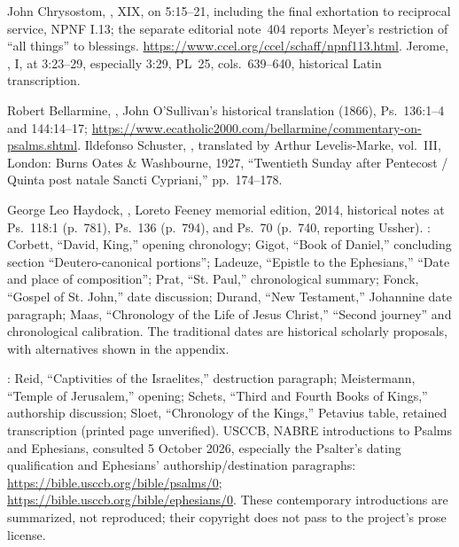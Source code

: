 \begin{description}[style=nextline,leftmargin=0pt,labelsep=0pt,itemsep=.45em]
\item[Chrysostom and Jerome]
John Chrysostom, , XIX, on 5:15--21,
including the final exhortation to reciprocal service, NPNF I.13;
the separate editorial note~404 reports Meyer's restriction of ``all
things'' to blessings. \url{https://www.ccel.org/ccel/schaff/npnf113.html}.
Jerome, , I, at 3:23--29, especially 3:29,
PL~25, cols.~639--640, historical Latin transcription.

\item[Later saintly and liturgical reception]
Robert Bellarmine, , John
O'Sullivan's historical translation (1866), Ps.~136:1--4 and
144:14--17; \url{https://www.ecatholic2000.com/bellarmine/commentary-on-psalms.shtml}.
Ildefonso Schuster, , translated by Arthur
Levelis-Marke, vol.~III, London: Burns Oates \& Washbourne, 1927,
``Twentieth Sunday after Pentecost / Quinta post natale Sancti Cypriani,''
pp.~174--178.

\item[Scriptural chronology and historical attribution]
George Leo Haydock, ,
Loreto Feeney memorial edition, 2014, historical notes at Ps.~118:1
(p.~781), Ps.~136 (p.~794), and Ps.~70 (p.~740, reporting Ussher).
: Corbett, ``David, King,'' opening
chronology; Gigot, ``Book of Daniel,'' concluding section
``Deutero-canonical portions''; Ladeuze, ``Epistle to the Ephesians,''
``Date and place of composition''; Prat, ``St. Paul,'' chronological
summary; Fonck, ``Gospel of St. John,'' date discussion;
Durand, ``New Testament,'' Johannine date paragraph;
Maas, ``Chronology of the Life of Jesus Christ,'' ``Second journey''
and chronological calibration. The traditional dates are historical
scholarly proposals, with alternatives shown in the appendix.

\item[Jerusalem background and modern comparisons]
: Reid, ``Captivities of the
Israelites,'' destruction paragraph; Meistermann, ``Temple of
Jerusalem,'' opening; Schets, ``Third and Fourth Books of Kings,''
authorship discussion; Sloet, ``Chronology of the Kings,'' Petavius
table, retained transcription (printed page unverified).
USCCB, NABRE introductions to Psalms and Ephesians, consulted 5 October
2026, especially the Psalter's dating qualification and Ephesians'
authorship/destination paragraphs:
\url{https://bible.usccb.org/bible/psalms/0};
\url{https://bible.usccb.org/bible/ephesians/0}.
These contemporary introductions are summarized, not reproduced; their
copyright does not pass to the project's prose license.
\end{description}
